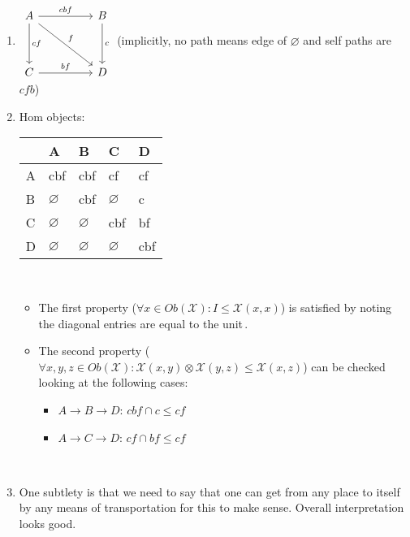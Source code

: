 \begin{enumerate}
    \item $\begin{tikzcd}[ampersand replacement=\&]A \arrow[dd, "cf"] \arrow[rr, "cbf"] \arrow[rrdd, "f"]  \&   \& B \arrow[dd, "c"] \\ \&   \&\\C \arrow[rr, "bf"] \&   \& D               \end{tikzcd}$ (implicitly, no path means edge of $\varnothing$ and self paths are $cfb$)
    \item Hom objects:\,

          \begin{minipage}{0.48\textwidth}
            \begin{tabular}{|l|l|l|l|l|}
              \hline
                & A             & B             & C             & D   \\ \hline
              A & cbf           & cbf           & cf            & cf  \\ \hline
              B & $\varnothing$ & cbf           & $\varnothing$ & c   \\  \hline
              C & $\varnothing$ & $\varnothing$ & cbf           & bf  \\  \hline
              D & $\varnothing$ & $\varnothing$ & $\varnothing$ & cbf \\ \hline
            \end{tabular}
          \end{minipage}\,

          \begin{itemize}
            \item   The first property ($\forall x \in Ob(\mathcal{X}): I \leq \mathcal{X}(x,x)$) is satisfied by noting \,the diagonal entries are equal to the unit\,.
            \item The second property ($\forall x,y,z \in Ob(\mathcal{X}): \mathcal{X}(x,y)\otimes\mathcal{X}(y,z) \leq \mathcal{X}(x,z)$) can be checked looking at the following cases:\,
                  \begin{itemize}
                    \item $A \rightarrow B \rightarrow D$: $cbf \cap c \leq cf$
                    \item $A \rightarrow C \rightarrow D$: $cf \cap bf \leq cf$
                  \end{itemize}\,

          \end{itemize}
    \item One subtlety is that we need to say that one can get from any place to itself by any means of transportation for this to make sense. Overall interpretation looks good.
  \end{enumerate}
